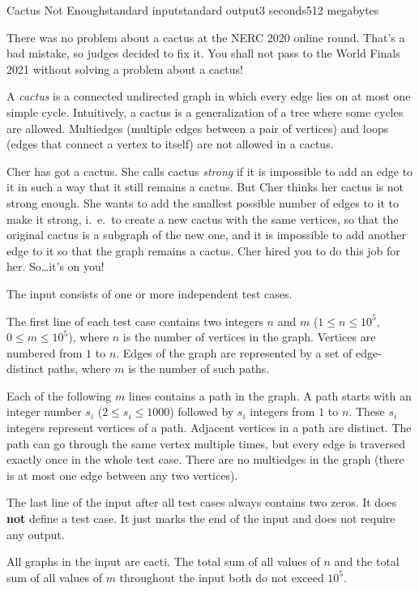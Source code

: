 \begin{problem}{Cactus Not Enough}{standard input}{standard output}{3 seconds}{512 megabytes}

There was no problem about a cactus at the NERC 2020 online round. That's a bad mistake, 
so judges decided to fix it. You shall not pass to the World Finals 2021 without solving
a problem about a cactus!

A \emph{cactus} is a connected undirected graph in which every edge lies on at most one simple cycle. Intuitively, a cactus is a generalization of a tree where some cycles are allowed. Multiedges (multiple edges between a pair of vertices) and 
loops (edges that connect a vertex to itself) are not allowed in a cactus. 

Cher has got a cactus. She calls cactus \emph{strong} if it is impossible to add an edge to it in such a way that it still remains a cactus. But Cher thinks her cactus is not strong enough. She wants to add the smallest possible number of edges to it to make it strong, i.~e.~to create a new cactus with the same vertices, so that the original cactus is a subgraph of the new one, and it is impossible to add another edge to it so that the graph remains a cactus. Cher hired you to do this job for her. So\ldots it's on you!


\InputFile
The input consists of one or more independent test cases.

The first line of each test case contains two integers $n$ and $m$ 
($1 \le n \le 10^5$, $0 \le m \le 10^5$), where $n$ is the number of vertices in the graph. Vertices are numbered from $1$ to $n$. Edges of the graph are represented by a set of edge-distinct paths, where $m$ is the number of such paths. 

Each of the following $m$ lines contains a path in the graph. A path starts
with an integer number $s_i$ ($2 \le s_i \le 1000$) followed by $s_i$ integers
from $1$ to $n$. These $s_i$ integers represent vertices of a path. Adjacent vertices in a path are distinct. The path can go through the same vertex multiple times, but every edge is traversed exactly once in the whole test case. There are no multiedges in the graph (there is at most one edge between any two vertices).

The last line of the input after all test cases always contains two zeros. It does \textbf{not} define a test case. It just marks the end of the input and does not require any output.

All graphs in the input are cacti. The total sum of all values of $n$ and
the total sum of all values of $m$ throughout the input both do not exceed $10^5$.



\end{problem}

